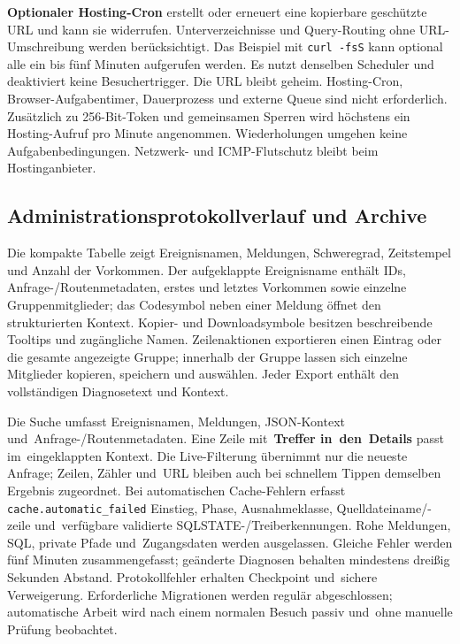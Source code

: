\documentclass[11pt,a4paper]{article}
\newcommand{\ui}[1]{\textbf{#1}}
\newcommand{\codeword}[1]{\nolinkurl{#1}}
\begin{document}
\ui{Optionaler Hosting-Cron} erstellt oder erneuert eine kopierbare geschützte
URL und kann sie widerrufen. Unterverzeichnisse und Query-Routing ohne
URL-Umschreibung werden berücksichtigt. Das Beispiel mit \codeword{curl -fsS}
kann optional alle ein bis fünf Minuten aufgerufen werden. Es nutzt denselben
Scheduler und deaktiviert keine Besuchertrigger. Die URL bleibt geheim.
Hosting-Cron, Browser-Aufgabentimer, Dauerprozess und externe Queue sind
nicht erforderlich.
Zusätzlich zu 256-Bit-Token und gemeinsamen Sperren wird höchstens ein
Hosting-Aufruf pro Minute angenommen. Wiederholungen umgehen keine
Aufgabenbedingungen. Netzwerk- und ICMP-Flutschutz bleibt beim Hostinganbieter.

\subsection{Administrationsprotokollverlauf und Archive}

Die kompakte Tabelle zeigt Ereignisnamen, Meldungen, Schweregrad, Zeitstempel
und Anzahl der Vorkommen. Der aufgeklappte Ereignisname enthält IDs,
Anfrage-/Routenmetadaten, erstes und letztes Vorkommen sowie einzelne
Gruppenmitglieder; das Codesymbol neben einer Meldung öffnet den strukturierten
Kontext. Kopier- und Downloadsymbole besitzen beschreibende Tooltips und
zugängliche Namen. Zeilenaktionen exportieren einen Eintrag oder die gesamte
angezeigte Gruppe; innerhalb der Gruppe lassen sich einzelne Mitglieder
kopieren, speichern und auswählen. Jeder Export enthält den vollständigen
Diagnosetext und Kontext.

Die Suche umfasst Ereignisnamen, Meldungen, JSON-Kontext
und~Anfrage-/Routenmetadaten. Eine Zeile mit~\ui{Treffer in~den~Details} passt
im~eingeklappten Kontext. Die Live-Filterung übernimmt nur die neueste Anfrage;
Zeilen, Zähler und~URL bleiben auch bei schnellem Tippen demselben Ergebnis
zugeordnet. Bei automatischen Cache-Fehlern erfasst
\codeword{cache.automatic\_failed} Einstieg, Phase, Ausnahmeklasse,
Quelldateiname/-zeile und~verfügbare validierte SQLSTATE-/Treiberkennungen. Rohe
Meldungen, SQL, private Pfade und~Zugangsdaten werden ausgelassen. Gleiche
Fehler werden fünf Minuten zusammengefasst; geänderte Diagnosen behalten
mindestens dreißig Sekunden Abstand. Protokollfehler erhalten Checkpoint
und~sichere Verweigerung. Erforderliche Migrationen werden regulär
abgeschlossen; automatische Arbeit wird nach einem normalen Besuch passiv
und~ohne manuelle Prüfung beobachtet.
\end{document}

